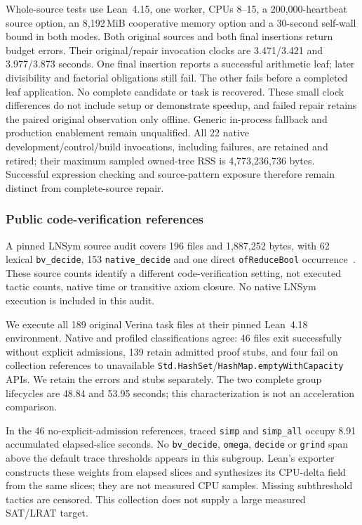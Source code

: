 \documentclass[10pt,twocolumn]{article}
\begin{document}
Whole-source tests use Lean~4.15, one worker, CPUs 8--15,
a 200,000-heartbeat source option, an 8,192\,MiB cooperative memory option
and a 30-second self-wall bound in both modes.
Both original sources and both final insertions return budget errors.
Their original/repair invocation clocks are 3.471/3.421 and 3.977/3.873
seconds. One final insertion reports a successful arithmetic leaf; later
divisibility and factorial obligations still fail. The other fails before
a completed leaf application. No complete candidate or task is recovered.
These small clock differences do not include setup or demonstrate speedup,
and failed repair retains the paired original observation only offline.
Generic in-process fallback and production enablement remain unqualified.
All 22 native development/control/build invocations, including failures,
are retained and retired; their maximum sampled owned-tree RSS is
4,773,236,736 bytes. Successful expression checking and source-pattern
exposure therefore remain distinct from complete-source repair.

\subsubsection{Public code-verification references}
A pinned LNSym source audit covers 196 files and 1,887,252 bytes,
with 62 lexical \texttt{bv\_decide}, 153 \texttt{native\_decide} and one direct
\texttt{ofReduceBool} occurrence~\cite{lnsymPinned}.
These source counts identify a different code-verification setting, not
executed tactic counts, native time or transitive axiom closure.
No native LNSym execution is included in this audit.

We execute all 189 original Verina task files at their pinned Lean~4.18
environment. Native and profiled classifications agree: 46 files exit
successfully without explicit admissions, 139 retain admitted proof stubs,
and four fail on collection references to unavailable
\texttt{Std.HashSet}/\texttt{HashMap.emptyWithCapacity} APIs.
We retain the errors and stubs separately.
The two complete group lifecycles are 48.84 and 53.95 seconds;
this characterization is not an acceleration comparison.

In the 46 no-explicit-admission references, traced \texttt{simp} and
\texttt{simp\_all} occupy 8.91 accumulated elapsed-slice seconds.
No \texttt{bv\_decide}, \texttt{omega}, \texttt{decide} or \texttt{grind}
span above the default trace thresholds appears in this subgroup.
Lean's exporter constructs these weights from elapsed slices and
synthesizes its CPU-delta field from the same slices; they are not measured
CPU samples. Missing subthreshold tactics are censored.
This collection does not supply a large measured SAT/LRAT target.
\end{document}

